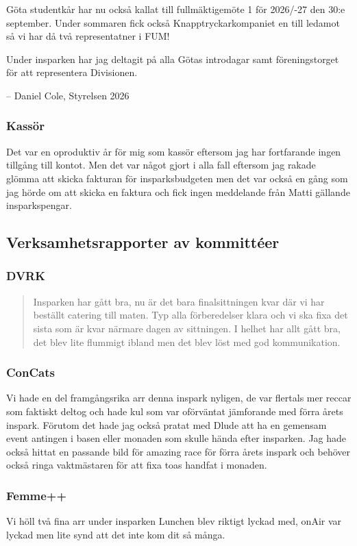 \documentclass[protokoll]{dvd}
\def\ordf{Daniel Cole}
\begin{document}
Göta studentkår har nu också kallat till fullmäktigemöte 1 för 2026/-27 den 30:e september. Under sommaren fick också Knapptryckarkompaniet en till ledamot så vi har då två representatner i FUM! 


Under insparken har jag deltagit på alla Götas introdagar samt föreningstorget för att representera Divisionen. 

-- \ordf, Styrelsen 2026

\subsubsection*{Kassör}
Det var en oproduktiv år för mig som kassör eftersom jag har fortfarande ingen tillgång till kontot. Men det var något gjort i alla fall eftersom jag rakade glömma att skicka fakturan för insparksbudgeten men det var också en gång som jag hörde om att skicka en faktura och fick ingen meddelande från Matti gällande insparkspengar.

\subsection{Verksamhetsrapporter av kommittéer}

\subsubsection*{DVRK}
\begin{quote}
    Insparken har gått bra, nu är det bara finalsittningen kvar där vi har beställt catering till maten. Typ alla förberedelser klara och vi ska fixa det sista som är kvar närmare dagen av sittningen. 
    I helhet har allt gått bra, det blev lite flummigt ibland men det blev löst med god kommunikation. 
\end{quote}

\subsubsection*{ConCats}
Vi hade en del framgångsrika arr denna inspark nyligen, de var flertals mer reccar som faktiskt deltog och hade kul som var oförväntat jämforande med förra årets inspark. Förutom det hade jag också pratat med Dlude att ha en gemensam event antingen i basen eller monaden som skulle hända efter insparken. Jag hade också hittat en passande bild för amazing race för förra årets inspark och behöver också ringa vaktmästaren för att fixa toas handfat i monaden.

\subsubsection*{Femme++}
Vi höll två fina arr under insparken Lunchen blev riktigt lyckad med, onAir var lyckad men lite synd att det inte kom dit så många. 
\end{document}
